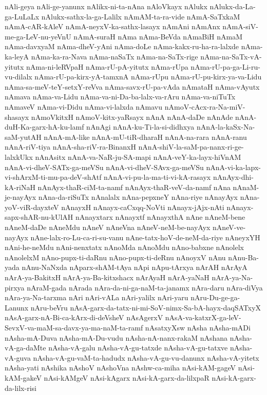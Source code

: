 {nAli-geya
nAli-ge-yanunx
nAlikx-ni-ta-nAna
nAloVkayx
nAlukx
nAlukx-da-La-ga-LuLaLx
nAlukx-sathx-la-ga-Lalilx
nAmAM-ta-ra-vide
nAmA-SaTxkaM
nAmA-cAR-kAleV
nAmA-neyxV-ka-sathx-lasayx
nAmAni
nAmAnx
nAmA-siV-me-ga-LeV-nu-yeVnU
nAmA-suraH
nAma
nAma-BeVda
nAmaBiH
nAmaM
nAma-davxyaM
nAma-dheV-yAni
nAma-doLe
nAma-kakx-ru-ha-ra-lalxde
nAma-ka-leyA
nAma-ka-ra-Nava
nAma-naSaTx
nAma-na-SaTx-rige
nAma-na-SaTx-vA-yitutx
nAma-ni-leRVpaH
nAma-rU-pA-yitutx
nAma-rUpa
nAma-rU-pa-ga-Li-ru-vu-dilalx
nAma-rU-pa-kirx-yA-tamxnA
nAma-rUpu
nAma-rU-pu-kirx-ya-va-Lidu
nAma-sa-meV-teY-setxY-reVva
nAma-savx-rU-pa-vAda
nAmataH
nAma-vAyutx
nAmava
nAma-va-Lidu
nAma-va-ni-Da-ba-lalx-va-rAru
nAma-va-niTuTx
nAmaveV
nAma-vi-Didu
nAma-vi-lalxda
nAmavu
nAmoV-cAcx-ra-Na-miV-shasayx
nAmoVkitxH
nAmoV-kitx-yaRsayx
nAnA
nAnA-daDe
nAnAde
nAnA-duH-Ka-garx-hA-ku-lamf
nAnAgi
nAnA-ku-Ti-la-si-didhxya
nAnA-la-kaSx-Na-saM-yutAH
nAnA-mA-like
nAnA-mU-tiR-dharaH
nAnA-na-rara
nAnA-ranu
nAnA-riV-tiya
nAnA-sha-riV-ra-BinanxH
nAnA-shiV-la-saM-pa-nanx-ri-ge-lalxkUkx
nAnAsitx
nAnA-va-NaR-ju-SA-mapi
nAnA-veY-ka-layx-hiVnAM
nAnA-vi-dheV-SATx-ga-meVSu
nAnA-vi-dheV-SAvx-ga-meVSu
nAnA-vi-ka-lapx-vi-shArxM-ti-mu-pa-deV-shAtf
nAnA-vi-pu-la-ma-ti-vi-kA-rasayx
nAnAyx-dhi-kA-riNaH
nAnAyx-thaR-ciM-ta-namf
nAnAyx-thaR-veV-da-namf
nAna
nAnaM-je-nayAyx
nAna-da-riSuTx
nAnalalx
nAna-pepxneY
nAna-riye
nAnayAyx
nAna-yoV-viR-dayxteV
nAnayxH
nAnayx-caCxqq-NoVti
nAnayx-jAjx-nAti
nAnayx-sapx-shAR-nu-kUlAH
nAnayxtarx
nAnayxtf
nAnayxthA
nAne
nAneM-bene
nAneM-daDe
nAneMdu
nAneV
nAneVna
nAneV-neM-be-nayAyx
nAneV-ve-nayAyx
nAne-lalx-ro-Lu-ca-ri-su-vanu
nAne-tatx-hoV-de-neM-da-riye
nAneyxYH
nAni-he-neMdu
nAni-nenxtatx
nAnoMda
nAnoMdu
nAno-babxne
nAnolelx
nAnolelxM
nAno-pupx-ti-daRnu
nAno-pupx-ti-deRnu
nAnoyxV
nAnu
nAnu-Ba-yada
nAnu-NaNxda
nAparx-shAM-tAya
nApi
nApu-tArxya
nArAH
nArAyA
nArA-ya-BakitxH
nArA-ya-Ba-kitxshacx
nArAyaH
nArA-yaNaH
nArA-ya-Na-pirxya
nAraM-gada
nArada
nAra-da-ni-ga-naM-ta-janamx
nAra-daru
nAra-diVya
nAra-ya-Na-tarxma
nAri
nAri-vALa
nAri-yalilx
nAri-yaru
nAru-Du-ge-ga-Lanunx
nAru-beVru
nAsA-garx-da-tatx-ni-mi-SoV-nimx-Sa-bA-hayx-daqSATxyX
nAsA-garx-nA-Bi-ca-kArx-di-deVsheV
nAsAgerxV
nAsA-va-katxrX-ga-leV-SevxV-va-maM-sa-davx-ya-ma-naM-ta-ramf
nAsatxyXsw
nAsha
nAsha-mADi
nAsha-mA-Duva
nAsha-mA-Du-vudu
nAsha-nA-nanx-rakaM
nAshana
nAsha-vA-ga-daMte
nAsha-vA-galu
nAsha-vA-gu-tatxde
nAsha-vA-gu-tatxve
nAsha-vA-guva
nAsha-vA-gu-vaM-ta-hadudx
nAsha-vA-gu-vu-danunx
nAsha-vA-yitetx
nAsha-yati
nAshika
nAshoV
nAshoVna
nAshw-ca-miha
nAsi-kAM-gageV
nAsi-kAM-gakeV
nAsi-kAMgeV
nAsi-kAgarx
nAsi-kA-garx-da-lilxpaR
nAsi-kA-garx-da-lilx-risi
}
